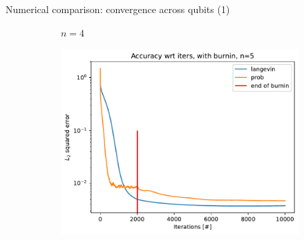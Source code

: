 \documentclass{beamer}
\begin{document}
\begin{frame}{Numerical comparison: convergence across qubits (1)}
\begin{figure}[H]
\begin{subfigure}[b]{0.4\textwidth}
            \caption{$n=4$}
        
        \end{subfigure}
    
        \begin{subfigure}[b]{0.4\textwidth}
    
    
            \centering
            \includegraphics[width=\linewidth]{figures/experiments/baseline/diff_n_qubits/iters_acc_comp_iters_no_avg_n5-1.png}
        \end{subfigure}
            \quad
            \begin{minipage}[b]{.1\textwidth}
            \end{minipage}
        
    \end{figure}
\end{frame}
    
\end{document}
